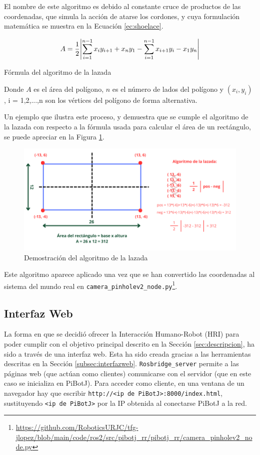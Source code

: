 El nombre de este algoritmo es debido al constante cruce de productos de las coordenadas, que simula la acción de atarse los cordones, y cuya formulación matemática se muestra en la Ecuación \ref{ec:shoelace}.
\begin{myequation}[h]
	\begin{equation}
		A = \frac{1}{2}\abs{\sum_{i=1}^{n-1}x_i y_{i+1} + x_n y_1 - \sum_{i=1}^{n-1}x_{i+1} y_{i} - x_1 y_n}
		\nonumber
	\end{equation}
	\caption[Fórmula del algoritmo de la lazada]{Fórmula del algoritmo de la lazada}
	\label{ec:shoelace}
\end{myequation} 

Donde $A$ es el área del polígono, $n$ es el número de lados del polígono y $(x_i, y_i)$ , i = 1,2,...,n son los vértices del polígono de forma alternativa.

Un ejemplo que ilustra este proceso, y demuestra que se cumple el algoritmo de la lazada con respecto a la fórmula usada para calcular el área de un rectángulo, se puede apreciar en la Figura \ref{fig:demoshoelace}.

 \begin{figure} [h!]
	\begin{center}
		\includegraphics[width=15cm]{figs/cap6/demoshoelace.png}
	\end{center}
	\caption{Demostración del algoritmo de la lazada}
	\label{fig:demoshoelace}
\end{figure}


Este algoritmo aparece aplicado una vez que se han convertido las coordenadas al sistema del mundo real en \verb|camera_pinholev2_node.py|\footnote{\url{https://github.com/RoboticsURJC/tfg-jlopez/blob/main/code/ros2/src/pibotj_rr/pibotj_rr/camera_pinholev2_node.py}}.


\subsection{Interfaz Web}
\label{subsec:softwareweb}
La forma en que se decidió ofrecer la Interacción Humano-Robot (HRI) para poder cumplir con el objetivo principal descrito en la Sección \ref{sec:descripcion}, ha sido a través de una interfaz web. Esta ha sido creada gracias a las herramientas descritas en la Sección \ref{subsec:interfazweb}. \verb|Rosbridge_server| permite a las páginas web (que actúan como clientes) comunicarse con el servidor (que en este caso se inicializa en PiBotJ). Para acceder como cliente, en una ventana de un navegador hay que escribir \verb|http://<ip de PiBotJ>:8000/index.html|, sustituyendo \verb|<ip de PiBotJ>| por la IP obtenida al conectarse PiBotJ a la red.
 
